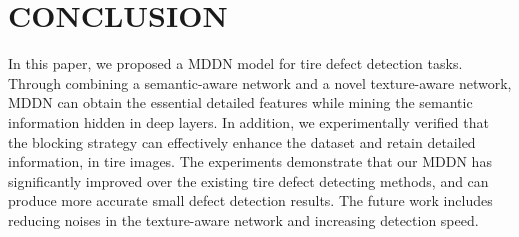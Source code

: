 \documentclass{article}
\begin{document}


\section{CONCLUSION}
\label{sec:typestyle}

In this paper, we proposed a MDDN model for tire defect detection tasks. Through combining a semantic-aware network and a novel texture-aware network, MDDN can obtain the essential detailed features while mining the semantic information hidden in deep layers. In addition, we experimentally verified that the blocking strategy can effectively enhance the dataset and retain detailed information, in tire images. The experiments demonstrate that our MDDN has significantly improved over the existing tire defect detecting methods, and can produce more accurate small defect detection results. The future work includes reducing noises in the texture-aware network and increasing detection speed.


\vfill\pagebreak





\end{document}
